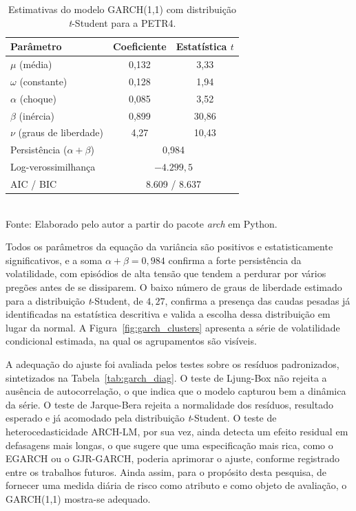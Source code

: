 \begin{table}[htpb]
\centering
\caption{Estimativas do modelo GARCH(1,1) com distribuição \textit{t}-Student para a PETR4.}
\label{tab:garch}
\begin{tabular}{lcc}
\hline
\textbf{Parâmetro} & \textbf{Coeficiente} & \textbf{Estatística $t$} \\ \hline
$\mu$ (média) & 0,132 & 3,33 \\
$\omega$ (constante) & 0,128 & 1,94 \\
$\alpha$ (choque) & 0,085 & 3,52 \\
$\beta$ (inércia) & 0,899 & 30,86 \\
$\nu$ (graus de liberdade) & 4,27 & 10,43 \\ \hline
Persistência ($\alpha + \beta$) & \multicolumn{2}{c}{0,984} \\
Log-verossimilhança & \multicolumn{2}{c}{$-4.299{,}5$} \\
AIC / BIC & \multicolumn{2}{c}{8.609 / 8.637} \\ \hline
\end{tabular}
\vspace{0.2cm}
{\small \\ Fonte: Elaborado pelo autor a partir do pacote \textit{arch} em Python.}
\end{table}

Todos os parâmetros da equação da variância são positivos e estatisticamente significativos, e a soma $\alpha + \beta = 0{,}984$ confirma a forte persistência da volatilidade, com episódios de alta tensão que tendem a perdurar por vários pregões antes de se dissiparem. O baixo número de graus de liberdade estimado para a distribuição \textit{t}-Student, de $4{,}27$, confirma a presença das caudas pesadas já identificadas na estatística descritiva e valida a escolha dessa distribuição em lugar da normal. A Figura~\ref{fig:garch_clusters} apresenta a série de volatilidade condicional estimada, na qual os agrupamentos são visíveis.

A adequação do ajuste foi avaliada pelos testes sobre os resíduos padronizados, sintetizados na Tabela~\ref{tab:garch_diag}. O teste de Ljung-Box não rejeita a ausência de autocorrelação, o que indica que o modelo capturou bem a dinâmica da série. O teste de Jarque-Bera rejeita a normalidade dos resíduos, resultado esperado e já acomodado pela distribuição \textit{t}-Student. O teste de heterocedasticidade ARCH-LM, por sua vez, ainda detecta um efeito residual em defasagens mais longas, o que sugere que uma especificação mais rica, como o EGARCH ou o GJR-GARCH, poderia aprimorar o ajuste, conforme registrado entre os trabalhos futuros. Ainda assim, para o propósito desta pesquisa, de fornecer uma medida diária de risco como atributo e como objeto de avaliação, o GARCH(1,1) mostra-se adequado.

